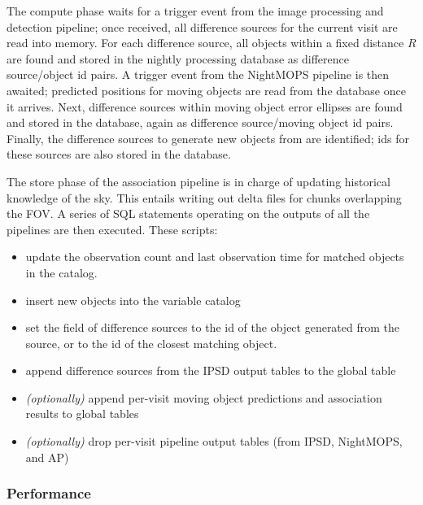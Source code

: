 The compute phase waits for a trigger event from the image processing and
detection pipeline; once received, all difference sources for the current
visit are read into memory. For each difference source, all objects within a
fixed distance $R$ are found and stored in the nightly processing database as
difference source/object id pairs. A trigger event from the NightMOPS
pipeline is then awaited; predicted positions for moving objects are read from
the database once it arrives. Next, difference sources within moving object
error ellipses are found and stored in the database, again as difference
source/moving object id pairs. Finally, the difference sources to generate new
objects from are identified; ids for these sources are also stored in the database.

The store phase of the association pipeline is in charge of updating
historical knowledge of the sky. This entails writing out delta files for
chunks overlapping the FOV. A series of SQL statements operating on the
outputs of all the pipelines are then executed. These scripts:

\begin{itemize}
\item update the observation count and last observation time for matched
      objects in the  catalog.

\item insert new objects into the variable  catalog

\item set the  field of difference sources to the id of the
      object generated from the source, or to the id of the closest matching
      object.

\item append difference sources from the IPSD output tables to the global
       table

\item \emph{(optionally)} append per-visit moving object predictions and
      association results to global tables

\item \emph{(optionally)} drop per-visit pipeline output tables (from IPSD,
      NightMOPS, and AP)
\end{itemize}

\subsubsection{Performance}

